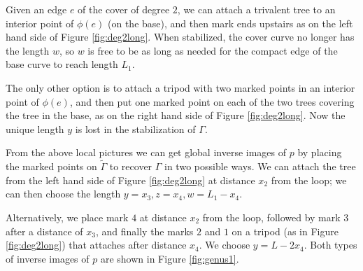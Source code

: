 \documentclass[11pt,reqno]{amsart}
\theoremstyle{definition}
\newcommand\trop{{\mathtt{trop}}}
\newcommand\Hur[1]{\mathcal H_{#1}}
\newcommand{\Ft}{\mathsf{F_t}}
\newcommand{\Fs}{\mathsf{F_s}}
\begin{document}
Given an edge $e$ of the cover of degree $2$, we can attach a trivalent tree to an 
interior point of $\phi(e)$ (on the base), and then mark ends upstairs as on the left hand side of Figure \ref{fig:deg2long}. When stabilized, the cover curve no longer has the length $w$, so $w$ is free to be as long as needed for the compact edge of the base curve to reach length $L_1$. 


The only other option is to attach a tripod with two marked points in an interior point of $\phi(e)$,  and then put one marked point on each of the two trees covering the tree in the base, as on the right hand side of Figure \ref{fig:deg2long}. Now the unique length $y$ is lost in the stabilization of $\Gamma$.

From the above local pictures we can get global inverse images of $p$ by placing the marked points on $\tilde{\Gamma}$ to recover $\Gamma$ in two possible ways.
We can attach the tree from the left hand side of Figure \ref{fig:deg2long} at distance $x_2$ from the loop; we can then choose the length $y = x_3, z = x_4 , w = L_1-x_4$.

Alternatively, we place mark $4$ at distance $x_2$ from the loop, followed by mark $3$ after a distance of $x_3$,  and finally  the marks $2$ and $1$ on a tripod (as in Figure \ref{fig:deg2long}) that attaches after distance $x_4$. We  choose $y = L-2x_4$.
Both types of inverse images of $p$ are shown in Figure \ref{fig:genus1}.
\end{document}
